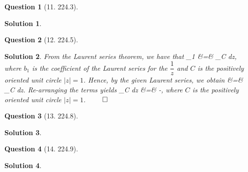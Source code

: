 \documentclass{article} %
\def\eQb#1\eQe{\begin{eqnarray*}#1\end{eqnarray*}}
\theoremstyle{quest}
\newtheorem*{question}{Question}
\newtheorem*{solution}{Solution}
\begin{document}
\bigskip

\begin{question}[11. 224.3]
\end{question}
\begin{solution}
\end{solution}

\bigskip

\begin{question}[12. 224.5]
\end{question}
\begin{solution}
From the Laurent series theorem, we have that
\eQb
b_1 &=&  \int_{C}  dz,
\eQe
where $b_1$ is the coefficient of the Laurent series for the $\dfrac{1}{z}$
and $C$ is the positively oriented unit circle $|z| = 1$.
Hence, by the given Laurent series, we obtain
\eQb
- &=&  \int_{C}  dz.
\eQe
Re-arranging the terms yields
\eQb
\int_{C}  dz &=& -,
\eQe
where $C$ is the positively oriented unit circle $|z| = 1$. $\qed$

\end{solution}
\bigskip

\begin{question}[13. 224.8]
\end{question}
\begin{solution}
\end{solution}
\bigskip

\begin{question}[14. 224.9]
\end{question}
\begin{solution}
\end{solution}
\bigskip
\end{document}
